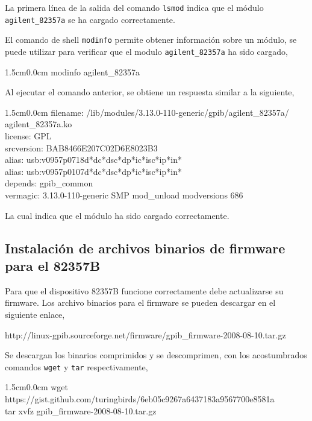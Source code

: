 \documentclass[paper=letter,oneside,fontsize=11pt, parskip=full]{scrartcl}
\newenvironment{code}
	{\begin{adjustwidth}{1.5cm}{0.0cm}\ttfamily}
	{\end{adjustwidth}}
\newenvironment{link}
	{\ttfamily}{}
\begin{document}
		La primera línea de la salida del comando \texttt{lsmod} indica que el módulo \texttt{agilent\_82357a} se ha cargado correctamente. 	
		
		El comando de shell \texttt{modinfo} permite obtener información sobre un módulo, se puede utilizar para verificar que el modulo \texttt{agilent\_82357a} ha sido cargado, 
		
		\begin{code}
			modinfo agilent\_82357a 			
		\end{code}
		
		Al ejecutar el comando anterior, se obtiene un respuesta similar a la siguiente,
		
		\begin{code}
			filename:    /lib/modules/3.13.0-110-generic/gpib/agilent\_82357a/ \\ agilent\_82357a.ko \\
			license:        GPL \\
			srcversion:     BAB8466E207C02D6E8023B3 \\
			alias:          usb:v0957p0718d*dc*dsc*dp*ic*isc*ip*in* \\
			alias:          usb:v0957p0107d*dc*dsc*dp*ic*isc*ip*in* \\
			depends:        gpib\_common \\
			vermagic:       3.13.0-110-generic SMP mod\_unload  modversions 686 
		\end{code}
	
		La cual indica que el módulo ha sido cargado correctamente.
		
		\subsection{Instalación de archivos binarios de firmware para el 82357B}	
		
		
		Para que el dispositivo 82357B funcione correctamente debe actualizarse su firmware. Los archivo binarios para el firmware se pueden descargar en el siguiente enlace, 
		
		\begin{link}
			http://linux-gpib.sourceforge.net/firmware/gpib\_firmware-2008-08-10.tar.gz
		\end{link}
	
		Se descargan los binarios comprimidos y se descomprimen, con los acostumbrados comandos \texttt{wget} y \texttt{tar} respectivamente,
		
		\begin{code}
			wget https://gist.github.com/turingbirds/6eb05c9267a6437183a9567700e8581a \\ 		
			tar xvfz gpib\_firmware-2008-08-10.tar.gz 
		\end{code}
		
\end{document}
